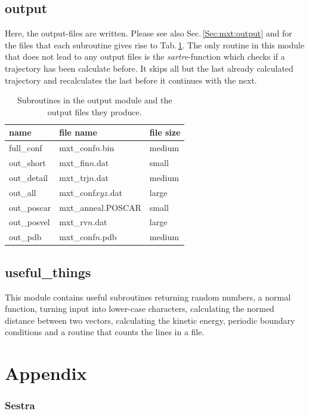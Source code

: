 \documentclass[twoside, 11pt, titlepage, captions=nooneline, a4paper, headsepline]{scrbook}%
\newcommand{\9}{\mathrm}
\newcommand{\0}{\,\mathrm}
\begin{document}
\section{output}
Here, the output-files are written. Please see also Sec.\,\ref{Sec:mxt:output} and for the files that each subroutine gives rise to Tab.\,\ref{Tab:Funct:output}. The only routine in this module that does not lead to any output files is the \textit{sartre}-function which checks if a trajectory has been calculate before. It skips all but the last already calculated trajectory and recalculates the last before it continues with the next.

\begin{table}[b!]
\centering
\caption{Subroutines in the output module and the output files they produce.}
\label{Tab:Funct:output}
\begin{tabular}{lll}
\hline\hline
name			&file name			& file size\\
\hline
full\_conf		&mxt\_conf$n$.bin	&medium\\
out\_short		&mxt\_fin$n$.dat 	&small\\
out\_detail		&mxt\_trj$n$.dat	&medium\\
out\_all		&mxt\_conf$xyz$.dat	&large\\
out\_poscar		&mxt\_anneal.POSCAR	&small\\
out\_posvel		&mxt\_rv$n$.dat		&large\\
out\_pdb		&mxt\_conf$n$.pdb	&medium\\
\hline
\hline
\end{tabular}
\end{table}

\section{useful\_things}
This module contains useful subroutines returning random numbers, a normal function, turning input into lower-case characters, calculating the normed distance between two vectors, calculating the kinetic energy, periodic boundary conditions and a routine that counts the lines in a file.



\chapter{Appendix}

\subsection{Sestra}
\label{Sestra}
\end{document}
